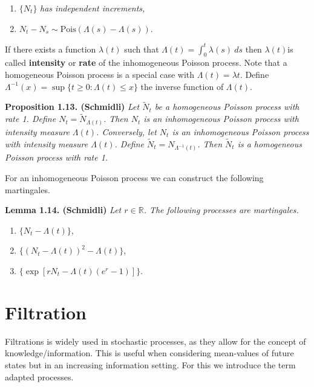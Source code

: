\documentclass[a4paper,12pt,openany]{book}
\providecommand{\tightlist}{%
 \setlength{\itemsep}{0pt}\setlength{\parskip}{0pt}}
\begin{document}
\begin{enumerate}
\def\labelenumi{\roman{enumi})}
\tightlist
\item
  \(\{N_t\}\) \emph{has independent increments,}
\item
  \(N_t-N_s\sim\text{Pois}(\Lambda (s)-\Lambda(s))\).
\end{enumerate}

If there exists a function \(\lambda(t)\) such that \(\Lambda(t) = \int_0^t \lambda(s)\ ds\) then \(\lambda(t)\)is called \textbf{intensity} or \textbf{rate} of the inhomogeneous Poisson process. Note that a homogeneous Poisson process is a special case with \(\Lambda(t) = \lambda t\). Define \(\Lambda^{−1}(x) = \sup\{t \ge 0 : \Lambda(t) \le x\}\) the inverse function of \(\Lambda(t)\).

\textbf{Proposition 1.13. (Schmidli)} \emph{Let \(\tilde N_t\) be a homogeneous Poisson process with rate 1. Define \(N_t=\tilde N_{\Lambda (t)}\). Then \(N_t\) is an inhomogeneous Poisson process with intensity measure \(\Lambda(t)\). Conversely, let \(N_t\) is an inhomogeneous Poisson process with intensity measure \(\Lambda(t)\). Define \(\tilde N_t=N_{\Lambda^{-1}(t)}\). Then \(\tilde N_t\) is a homogeneous Poisson process with rate 1.}

For an inhomogeneous Poisson process we can construct the following martingales.

\textbf{Lemma 1.14. (Schmidli)} \emph{Let \(r\in \mathbb R\). The following processes are martingales.}

\begin{enumerate}
\def\labelenumi{\roman{enumi})}
\tightlist
\item
  \(\{N_t-\Lambda(t)\}\),
\item
  \(\{(N_t-\Lambda(t))^2-\Lambda(t)\}\),
\item
  \(\{\exp[rN_t-\Lambda(t)(e^r-1)]\}\).
\end{enumerate}

\hypertarget{filtration}{%
\section{Filtration}\label{filtration}}

Filtrations is widely used in stochastic processes, as they allow for the concept of knowledge/information. This is useful when considering mean-values of future states but in an increasing information setting. For this we introduce the term adapted processes.
\end{document}
